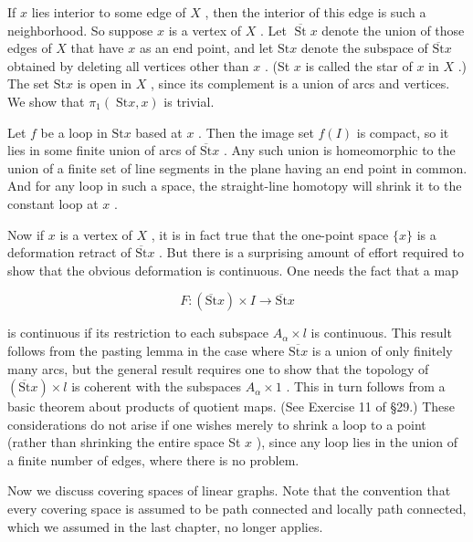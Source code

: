 If \(x\) lies interior to some edge of \(X\) , then the interior of this edge is such a neighborhood. So suppose \(x\) is a vertex of \(X\) . Let \(\overline{\operatorname{St}}x\) denote the union of those edges of \(X\) that have \(x\) as an end point, and let \(\mathrm{{St}}x\) denote the subspace of \(\overline{\mathrm{{St}}}x\) obtained by deleting all vertices other than \(x\) . (St \(x\) is called the star of \(x\) in \(X\) .) The set \(\mathrm{{St}}x\) is open in \(X\) , since its complement is a union of arcs and vertices. We show that \({\pi }_{1}\left( {\mathrm{\;{St}}x,x}\right)\) is trivial.

Let \(f\) be a loop in \(\mathrm{{St}}x\) based at \(x\) . Then the image set \(f\left( I\right)\) is compact, so it lies in some finite union of arcs of \(\overline{\mathrm{{St}}}x\) . Any such union is homeomorphic to the union of a finite set of line segments in the plane having an end point in common. And for any loop in such a space, the straight-line homotopy will shrink it to the constant loop at \(x\) .

Now if \(x\) is a vertex of \(X\) , it is in fact true that the one-point space \(\{ x\}\) is a deformation retract of \(\overline{\mathrm{{St}}}x\) . But there is a surprising amount of effort required to show that the obvious deformation is continuous. One needs the fact that a map

\[
F : \left( {\overline{\mathrm{{St}}}x}\right)  \times  I \rightarrow  \overline{\mathrm{{St}}}x
\]

is continuous if its restriction to each subspace \({A}_{\alpha } \times  l\) is continuous. This result follows from the pasting lemma in the case where \(\overline{\mathrm{{St}}x}\) is a union of only finitely many arcs, but the general result requires one to show that the topology of \(\left( {\overline{\mathrm{{St}}}x}\right)  \times  l\) is coherent with the subspaces \({A}_{\alpha } \times  1\) . This in turn follows from a basic theorem about products of quotient maps. (See Exercise 11 of  \S 29.) These considerations do not arise if one wishes merely to shrink a loop to a point (rather than shrinking the entire space St \(x\) ), since any loop lies in the union of a finite number of edges, where there is no problem.

Now we discuss covering spaces of linear graphs. Note that the convention that every covering space is assumed to be path connected and locally path connected, which we assumed in the last chapter, no longer applies.

